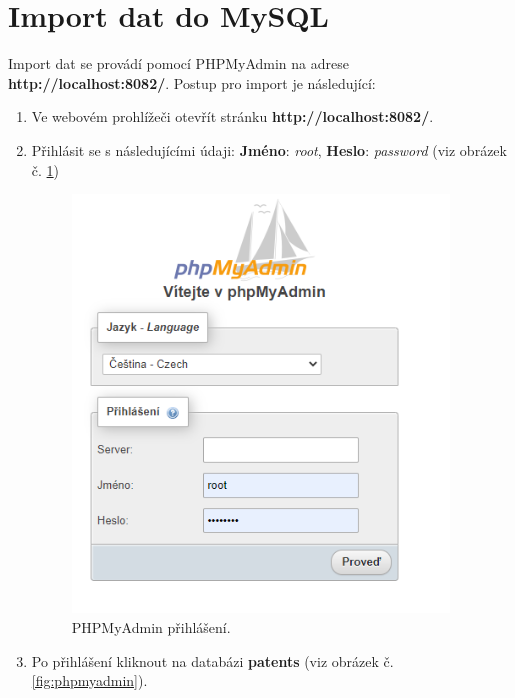 \section{Import dat do MySQL}
Import dat se provádí pomocí PHPMyAdmin na adrese \textbf{http://localhost:8082/}. Postup pro import je následující:
\begin{enumerate}
\item Ve webovém prohlížeči otevřít stránku \textbf{http://localhost:8082/}.
\item Přihlásit se s následujícími údaji: \textbf{Jméno}: \textit{root}, \textbf{Heslo}: \textit{password} (viz obrázek č. \ref{fig:mysqllogin})
	\begin{figure}[H]
	\centering
	\includegraphics[width=10cm]{img/manual/mysql_login}
	\caption{PHPMyAdmin přihlášení.}
	\label{fig:mysqllogin}
	\end{figure}
\item Po přihlášení kliknout na databázi \textbf{patents} (viz obrázek č. \ref{fig:phpmyadmin}).
	\begin{figure}[H]
	\centering

\end{figure}
\end{enumerate}

